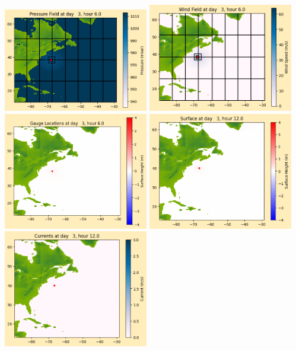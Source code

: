 \documentclass[11pt]{article}
\begin{document}
\includegraphics[width=0.475\textwidth]{frame0025fig1012.png}
\vskip 10pt 
\includegraphics[width=0.475\textwidth]{frame0025fig1013.png}
\includegraphics[width=0.475\textwidth]{frame0025fig1014.png}
\vskip 10pt 
\includegraphics[width=0.475\textwidth]{frame0026fig1001.png}
\includegraphics[width=0.475\textwidth]{frame0026fig1002.png}
\end{document}
